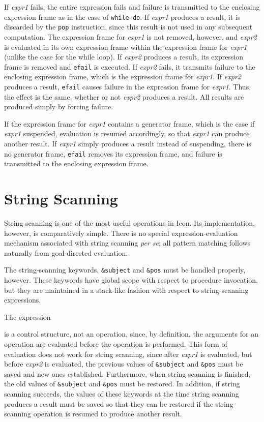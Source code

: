 If \textit{expr1} fails, the entire expression fails and failure is
transmitted to the enclosing expression frame as in the case of
\texttt{while-do}. If \textit{expr1} produces a result, it is
discarded by the \texttt{pop} instruction, since this result is not
used in any subsequent computation. The expression frame for
\textit{expr1} is not removed, however, and \textit{expr2} is
evaluated in its own expression frame within the expression frame for
\textit{expr1} (unlike the case for the while loop). If \textit{expr2}
produces a result, its expression frame is removed and \texttt{efail}
is executed. If \textit{expr2} fails, it transmits failure to the
enclosing expression frame, which is the expression frame for
\textit{expr1}. If \textit{expr2} produces a result, \texttt{efail}
causes failure in the expression frame for \textit{expr1}. Thus, the
effect is the same, whether or not \textit{expr2} produces a
result. All results are produced simply by forcing failure.

If the expression frame for \textit{expr1} contains a generator frame,
which is the case if \textit{expr1} suspended, evaluation is resumed
accordingly, so that \textit{expr1} can produce another result. If
\textit{expr1} simply produces a result instead of suspending, there
is no generator frame, \texttt{efail} removes its expression frame,
and failure is transmitted to the enclosing expression frame.


\section{String Scanning}

String scanning is one of the most useful operations in Icon. Its
implementation, however, is comparatively simple.  There is no special
expression-evaluation mechanism associated with string scanning
\textit{per se}; all {\textquotedbl}pattern matching{\textquotedbl}
follows naturally from goal-directed evaluation.

The string-scanning keywords, \texttt{\&subject} and \texttt{\&pos}
must be handled properly, however. These keywords have global scope
with respect to procedure invocation, but they are maintained in a
stack-like fashion with respect to string-scanning expressions.

The expression


\noindent is a control structure, not an operation, since, by
definition, the arguments for an operation are evaluated before the
operation is performed. This form of evaluation does not work for
string scanning, since after \textit{expr1} is evaluated, but before
\textit{expr2} is evaluated, the previous values of \texttt{\&subject}
and \texttt{\&pos} must be saved and new ones
established. Furthermore, when string scanning is finished, the old
values of \texttt{\&subject} and \texttt{\&pos} must be restored. In
addition, if string scanning succeeds, the values of these keywords at
the time string scanning produces a result must be saved so that they
can be restored if the string-scanning operation is resumed to produce
another result.

